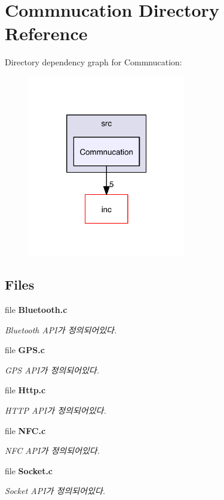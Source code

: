 \section{Commnucation Directory Reference}
\label{dir_7a83bc1081075b8472504e2ca489b0b5}
Directory dependency graph for Commnucation\-:\nopagebreak
\begin{figure}[H]
\begin{center}
\leavevmode
\includegraphics[width=196pt]{dir_7a83bc1081075b8472504e2ca489b0b5_dep}
\end{center}
\end{figure}
\subsection*{Files}
\begin{DoxyCompactItemize}
\item 
file {\bf Bluetooth.\-c}
\begin{DoxyCompactList}\small\item\em Bluetooth A\-P\-I가 정의되어있다. \end{DoxyCompactList}\item 
file {\bf G\-P\-S.\-c}
\begin{DoxyCompactList}\small\item\em G\-P\-S A\-P\-I가 정의되어있다. \end{DoxyCompactList}\item 
file {\bf Http.\-c}
\begin{DoxyCompactList}\small\item\em H\-T\-T\-P A\-P\-I가 정의되어있다. \end{DoxyCompactList}\item 
file {\bf N\-F\-C.\-c}
\begin{DoxyCompactList}\small\item\em N\-F\-C A\-P\-I가 정의되어있다. \end{DoxyCompactList}\item 
file {\bf Socket.\-c}
\begin{DoxyCompactList}\small\item\em Socket A\-P\-I가 정의되어있다. \end{DoxyCompactList}\end{DoxyCompactItemize}
